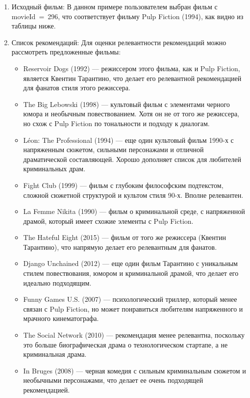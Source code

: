 \begin{enumerate}
\def\labelenumi{\arabic{enumi}.}
\item
  Исходный фильм: В данном примере пользователем выбран фильм с
  movieId\ =\ 296, что соответствует фильму Pulp Fiction
  (1994), как видно из таблицы ниже.
\item
  Список рекомендаций: Для оценки релевантности рекомендаций
  можно рассмотреть предложенные фильмы:

  \begin{itemize}
  \tightlist
  \item
    Reservoir Dogs (1992) --- режиссером этого фильма, как и
    Pulp Fiction, является Квентин Тарантино, что делает его
    релевантной рекомендацией для фанатов стиля этого режиссера.
  \item
    The Big Lebowski (1998) --- культовый фильм с элементами
    черного юмора и необычным повествованием. Хотя он не от того же
    режиссера, но схож с Pulp Fiction по тональности и подходу к
    диалогам.
  \item
    Léon: The Professional (1994) --- еще один культовый фильм
    1990-х с напряженным сюжетом, сильными персонажами и отличной
    драматической составляющей. Хорошо дополняет список для любителей
    криминальных драм.
  \item
    Fight Club (1999) --- фильм с глубоким философским
    подтекстом, сложной сюжетной структурой и культом стиля 90-х. Вполне
    релевантен.
  \item
    La Femme Nikita (1990) --- фильм о криминальной среде, с
    напряженной драмой, который имеет схожие элементы с Pulp
    Fiction.
  \item
    The Hateful Eight (2015) --- фильм от того же режиссера
    (Квентин Тарантино), что напрямую делает его релевантным для
    фанатов.
  \item
    Django Unchained (2012) --- еще один фильм Тарантино с
    уникальным стилем повествования, юмором и криминальной драмой, что
    делает его идеально подходящим.
  \item
    Funny Games U.S. (2007) --- психологический триллер,
    который менее связан с Pulp Fiction, но может понравиться
    любителям напряженного и мрачного кинематографа.
  \item
    The Social Network (2010) --- рекомендация менее
    релевантна, поскольку это больше биографическая драма о
    технологическом стартапе, а не криминальная драма.
  \item
    In Bruges (2008) --- черная комедия с сильным криминальным
    сюжетом и необычными персонажами, что делает ее очень подходящей
    рекомендацией.
  \end{itemize}
\end{enumerate}


